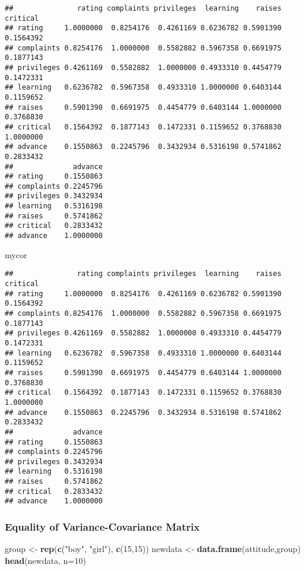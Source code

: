 \documentclass[]{article}
\newenvironment{Shaded}{\begin{snugshade}}{\end{snugshade}}
\newcommand{\KeywordTok}[1]{\textcolor[rgb]{0.13,0.29,0.53}{\textbf{#1}}}
\newcommand{\DataTypeTok}[1]{\textcolor[rgb]{0.13,0.29,0.53}{#1}}
\newcommand{\DecValTok}[1]{\textcolor[rgb]{0.00,0.00,0.81}{#1}}
\newcommand{\StringTok}[1]{\textcolor[rgb]{0.31,0.60,0.02}{#1}}
\newcommand{\NormalTok}[1]{#1}
\begin{document}
\begin{verbatim}
##               rating complaints privileges  learning    raises  critical
## rating     1.0000000  0.8254176  0.4261169 0.6236782 0.5901390 0.1564392
## complaints 0.8254176  1.0000000  0.5582882 0.5967358 0.6691975 0.1877143
## privileges 0.4261169  0.5582882  1.0000000 0.4933310 0.4454779 0.1472331
## learning   0.6236782  0.5967358  0.4933310 1.0000000 0.6403144 0.1159652
## raises     0.5901390  0.6691975  0.4454779 0.6403144 1.0000000 0.3768830
## critical   0.1564392  0.1877143  0.1472331 0.1159652 0.3768830 1.0000000
## advance    0.1550863  0.2245796  0.3432934 0.5316198 0.5741862 0.2833432
##              advance
## rating     0.1550863
## complaints 0.2245796
## privileges 0.3432934
## learning   0.5316198
## raises     0.5741862
## critical   0.2833432
## advance    1.0000000
\end{verbatim}

\begin{Shaded}
\begin{Highlighting}[]
\NormalTok{mycor}
\end{Highlighting}
\end{Shaded}

\begin{verbatim}
##               rating complaints privileges  learning    raises  critical
## rating     1.0000000  0.8254176  0.4261169 0.6236782 0.5901390 0.1564392
## complaints 0.8254176  1.0000000  0.5582882 0.5967358 0.6691975 0.1877143
## privileges 0.4261169  0.5582882  1.0000000 0.4933310 0.4454779 0.1472331
## learning   0.6236782  0.5967358  0.4933310 1.0000000 0.6403144 0.1159652
## raises     0.5901390  0.6691975  0.4454779 0.6403144 1.0000000 0.3768830
## critical   0.1564392  0.1877143  0.1472331 0.1159652 0.3768830 1.0000000
## advance    0.1550863  0.2245796  0.3432934 0.5316198 0.5741862 0.2833432
##              advance
## rating     0.1550863
## complaints 0.2245796
## privileges 0.3432934
## learning   0.5316198
## raises     0.5741862
## critical   0.2833432
## advance    1.0000000
\end{verbatim}

\subsubsection{Equality of Variance-Covariance
Matrix}\label{equality-of-variance-covariance-matrix}

\begin{Shaded}
\begin{Highlighting}[]
\NormalTok{group <-}\StringTok{ }\KeywordTok{rep}\NormalTok{(}\KeywordTok{c}\NormalTok{(}\StringTok{"boy"}\NormalTok{, }\StringTok{"girl"}\NormalTok{), }\KeywordTok{c}\NormalTok{(}\DecValTok{15}\NormalTok{,}\DecValTok{15}\NormalTok{))}
\NormalTok{newdata <-}\StringTok{ }\KeywordTok{data.frame}\NormalTok{(attitude,group)}
\KeywordTok{head}\NormalTok{(newdata, }\DataTypeTok{n=}\DecValTok{10}\NormalTok{)}
\end{Highlighting}
\end{Shaded}
\end{document}
